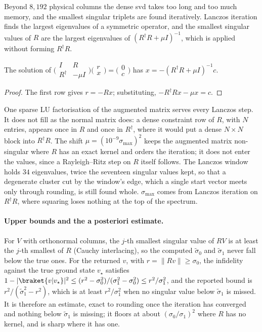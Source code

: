 Beyond $8{,}192$ physical columns the dense \gls{svd} takes too long and too much memory, and the smallest singular triplets are found iteratively. Lanczos iteration finds the largest eigenvalues of a symmetric operator, and the smallest singular values of $R$ are the largest eigenvalues of $(R^\dagger R+\mu I)^{-1}$, which is applied without forming $R^\dagger R$.

\begin{proposition}
The solution of $\bigl(\begin{smallmatrix}I&R\\R^\dagger&-\mu I\end{smallmatrix}\bigr)\bigl(\begin{smallmatrix}r\\x\end{smallmatrix}\bigr)=\bigl(\begin{smallmatrix}0\\c\end{smallmatrix}\bigr)$ has $x=-(R^\dagger R+\mu I)^{-1}c$.
\end{proposition}
\begin{proof}
The first row gives $r=-Rx$; substituting, $-R^\dagger Rx-\mu x=c$.
\end{proof}

One sparse LU factorisation of the augmented matrix serves every Lanczos step. It does not fill as the normal matrix does: a dense constraint row of $R$, with $N$ entries, appears once in $R$ and once in $R^\dagger$, where it would put a dense $N\times N$ block into $R^\dagger R$. The shift $\mu=(10^{-9}\sigma_{\max})^2$ keeps the augmented matrix non-singular where $R$ has an exact kernel and orders the iteration; it does not enter the values, since a Rayleigh--Ritz step on $R$ itself follows. The Lanczos window holds $34$ eigenvalues, twice the seventeen singular values kept, so that a degenerate cluster cut by the window's edge, which a single start vector meets only through rounding, is still found whole. $\sigma_{\max}$ comes from Lanczos iteration on $R^\dagger R$, where squaring loses nothing at the top of the spectrum.

\paragraph{Upper bounds and the a posteriori estimate.} For $V$ with orthonormal columns, the $j$-th smallest singular value of $RV$ is at least the $j$-th smallest of $R$ (Cauchy interlacing), so the computed $\tilde\sigma_0$ and $\tilde\sigma_1$ never fall below the true ones. For the returned $v$, with $r=\|Rv\|\ge\sigma_0$, the infidelity against the true ground state $v_\star$ satisfies $1-|\braket{v|v_\star}|^2\le(r^2-\sigma_0^2)/(\sigma_1^2-\sigma_0^2)\le r^2/\sigma_1^2$, and the reported bound is $r^2/(\tilde\sigma_1^2-r^2)$, which is at least $r^2/\sigma_1^2$ when no singular value below $\tilde\sigma_1$ is missed. It is therefore an estimate, exact to rounding once the iteration has converged and nothing below $\tilde\sigma_1$ is missing; it floors at about $(\sigma_0/\sigma_1)^2$ where $R$ has no kernel, and is sharp where it has one.

